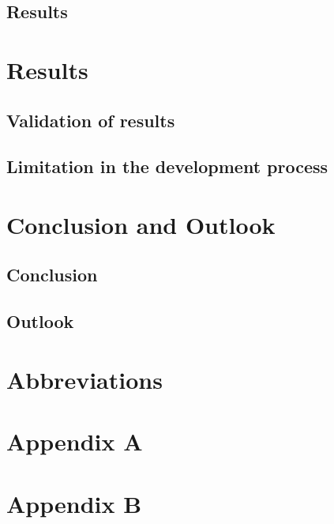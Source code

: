 \section{Results} 

\chapter{Results}
\section{Validation of results}
\section{Limitation in the development process}

\chapter{Conclusion and Outlook}
\section{Conclusion}
\section{Outlook}


\chapter{Abbreviations}


\printbibliography[heading=bibintoc]

\chapter{Appendix A}\label{appendix a}

\chapter{Appendix B}\label{appendix b}
%


